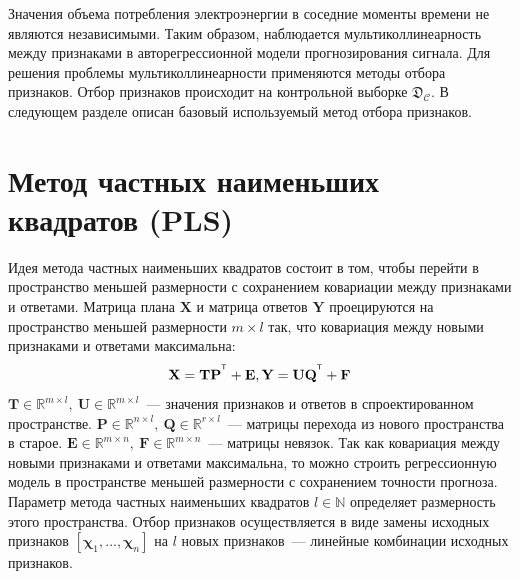 \documentclass[12pt,fleqn,unicode]{article}
\newcommand{\bY}{\mathbf{Y}}
\newcommand{\bX}{\mathbf{X}}
\newcommand{\bP}{\mathbf{P}}
\newcommand{\bT}{\mathbf{T}}
\newcommand{\bQ}{\mathbf{Q}}
\newcommand{\bE}{\mathbf{E}}
\newcommand{\bF}{\mathbf{F}}
\newcommand{\bU}{\mathbf{U}}
\newcommand{\bchi}{\boldsymbol{\chi}}
\newcommand{\T}{^{\text{\tiny\sffamily\upshape\mdseries T}}}
\begin{document}
Значения объема потребления электроэнергии в соседние моменты времени не являются независимыми.
Таким образом, наблюдается мультиколлинеарность между признаками в авторегрессионной модели прогнозирования сигнала.
Для решения проблемы мультиколлинеарности применяются методы отбора признаков. Отбор признаков происходит на контрольной выборке $\mathfrak{D}_\mathcal{C}$. В следующем разделе описан базовый используемый метод отбора признаков.

\newpage
\section{Метод частных наименьших квадратов (PLS)}
Идея метода частных наименьших квадратов состоит в том, чтобы перейти в пространство меньшей размерности с сохранением ковариации между признаками и ответами. Матрица плана $\bX$ и матрица ответов $\bY$ проецируются на пространство меньшей размерности $m \times l$ так, что ковариация между новыми признаками и ответами максимальна:
\begin{equation}
\label{pls_x_y}
    \bX = \bT \bP^{\T} + \bE,\\
    \bY = \bU \bQ^{\T} + \bF
\end{equation}
$\bT \in \mathbb{R}^{m \times l},\ \bU \in \mathbb{R}^{m \times l}$~--- значения признаков и ответов в спроектированном пространстве. $\bP \in \mathbb{R}^{n \times l},\ \bQ \in \mathbb{R}^{r \times l}$~--- матрицы перехода из нового пространства в старое. $\bE\in \mathbb{R}^{m \times n},\ \bF \in \mathbb{R}^{m \times n}$~--- матрицы невязок.
Так как ковариация между новыми признаками и ответами максимальна, то можно строить регрессионную модель в пространстве меньшей размерности с сохранением точности прогноза. Параметр метода частных наименьших квадратов $l \in \mathbb{N}$ определяет размерность этого пространства. Отбор признаков осуществляется в виде замены исходных признаков $[\bchi_1, \dots, \bchi_n]$ на $l$ новых признаков~--- линейные комбинации исходных признаков.
\end{document}
